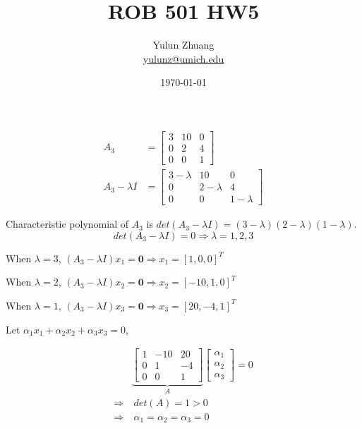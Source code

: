 \documentclass{article}
\title{ROB 501 HW5}
\author{Yulun Zhuang \\ \href{mailto:yulunz@umich.edu}{yulunz@umich.edu}}
\date{\today}
\theoremstyle{definition} %
\begin{document}
\maketitle

\section{}

\subsection{}

\begin{align*}
	A_3 &= 
	\begin{bmatrix}
		3 & 10 & 0\\
		0 & 2 & 4\\
		0 & 0 & 1
	\end{bmatrix}
	\\
	A_3 - \lambda I &= 
	\begin{bmatrix}
		3 - \lambda & 10 & 0\\
		0 & 2 - \lambda & 4\\
		0 & 0 & 1 - \lambda
	\end{bmatrix}
\end{align*}

Characteristic polynomial of $A_3$ is $det(A_3 - \lambda I)=(3-\lambda)(2-\lambda)(1-\lambda)$.
$$det(A_3 - \lambda I)=0 \Rightarrow \lambda = 1, 2, 3$$

When $\lambda=3$,
$
(A_3 - \lambda I)x_1 = \mathbf 0 \Rightarrow x_1 = [1, 0, 0]^T
$

When $\lambda=2$,
$
(A_3 - \lambda I)x_2 = \mathbf 0 \Rightarrow x_2 = [-10, 1, 0]^T
$

When $\lambda=1$,
$
(A_3 - \lambda I)x_3 = \mathbf 0 \Rightarrow x_3 = [20, -4, 1]^T
$


Let $\alpha_1 x_1 + \alpha_2 x_2 + \alpha_3 x_3 = 0$,

\begin{align*}
	&\underbrace{
		\begin{bmatrix}
			1 & -10 & 20\\
			0 & 1 & -4\\
			0 & 0 & 1
		\end{bmatrix}
	}_A
	\begin{bmatrix}
		\alpha_1 \\ \alpha_2 \\ \alpha_3
	\end{bmatrix}
	= 0 
	\\
	\Rightarrow &\ det(A) = 1 > 0\\
	\Rightarrow &\ \alpha_1 = \alpha_2 = \alpha_3 = 0
\end{align*}
\end{document}
